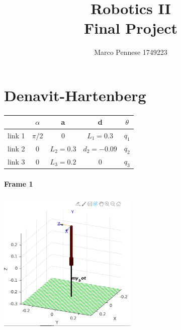 \documentclass{article}
\title{\textbf{Robotics II} \\ \large{\textbf{Final Project}}}
\author{Marco Pennese 1749223}
\date{}
\begin{document}
\maketitle
\tableofcontents
\pagebreak
\section{Denavit-Hartenberg}
\paragraph{}
\FloatBarrier
\begin{table}[!htbp]
\centering
\begin{tabular}{|c|cccc|}
\hline
& $\alpha$ & a & d & $\theta$\\
\hline
link 1 & $\pi$/2 & 0 & $L_1=0.3$ & $q_1$\\
link 2 & 0 & $L_2=0.3$ & $d_2=-0.09$ & $q_2$\\
link 3 & 0 & $L_3=0.2$ & 0 & $q_3$\\
\hline
\end{tabular}
\end{table}
\paragraph{Frame 1}
\begin{center}
\includegraphics[width=0.5\textwidth]{images/frame1.png}
\end{center}
\end{document}
